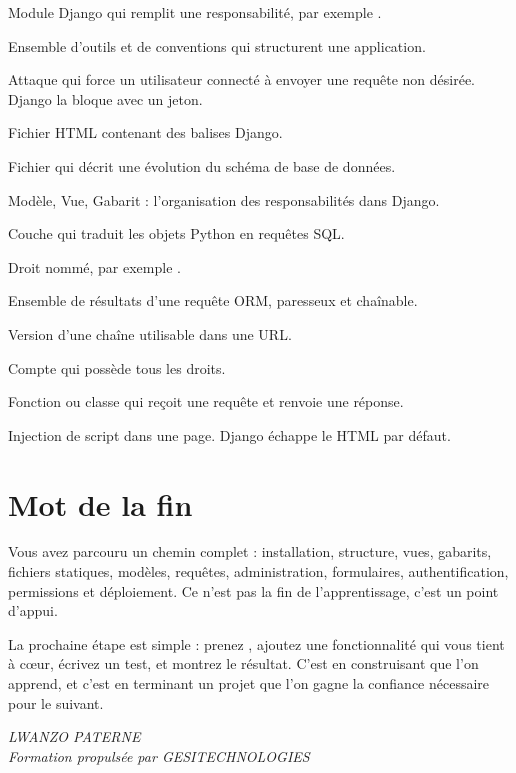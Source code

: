 \begin{description}[leftmargin=4.1cm,style=nextline]
  \item[Application] Module Django qui remplit une responsabilité, par exemple
  .
  \item[Cadriciel (framework)] Ensemble d'outils et de conventions qui structurent
  une application.
  \item[CSRF] Attaque qui force un utilisateur connecté à envoyer une requête non
  désirée. Django la bloque avec un jeton.
  \item[Gabarit (template)] Fichier HTML contenant des balises Django.
  \item[Migration] Fichier qui décrit une évolution du schéma de base de données.
  \item[MVT] Modèle, Vue, Gabarit : l'organisation des responsabilités dans
  Django.
  \item[ORM] Couche qui traduit les objets Python en requêtes SQL.
  \item[Permission] Droit nommé, par exemple .
  \item[QuerySet] Ensemble de résultats d'une requête ORM, paresseux et
  chaînable.
  \item[Slug] Version d'une chaîne utilisable dans une URL.
  \item[Superutilisateur] Compte qui possède tous les droits.
  \item[Vue] Fonction ou classe qui reçoit une requête et renvoie une réponse.
  \item[XSS] Injection de script dans une page. Django échappe le HTML par défaut.
\end{description}

\section{Mot de la fin}

Vous avez parcouru un chemin complet : installation, structure, vues, gabarits,
fichiers statiques, modèles, requêtes, administration, formulaires,
authentification, permissions et déploiement. Ce n'est pas la fin de
l'apprentissage, c'est un point d'appui.

La prochaine étape est simple : prenez \gesibiblio, ajoutez une fonctionnalité qui
vous tient à c\oe ur, écrivez un test, et montrez le résultat. C'est en construisant
que l'on apprend, et c'est en terminant un projet que l'on gagne la confiance
nécessaire pour le suivant.

\vspace{1cm}
\begin{flushright}
\textit{LWANZO PATERNE}\\
\textit{Formation propulsée par GESITECHNOLOGIES}
\end{flushright}
